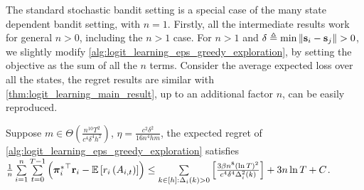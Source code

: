 The standard stochastic bandit setting is a special case of the many state dependent bandit setting, with $n = 1$. Firstly, all the intermediate results work for general $n > 0$, including the $n > 1$ case.
For $n > 1$ and $\delta \triangleq \min{\left\| {\mathbf{s}}_i - {\mathbf{s}}_j \right\|} > 0$, we slightly modify \cref{alg:logit_learning_eps_greedy_exploration}, by setting the objective as the sum of all the $n$ terms. Consider the average expected loss over all the states, the regret results are similar with \cref{thm:logit_learning_main_result}, up to an additional factor $n$, can be easily reproduced.
\begin{thm}
\label{thm:many_state_dependent_bandit_setting}
     Suppose $m \in \Theta\left( \frac{n^{10} T^2}{c^4 \delta^4 h^2} \right)$, $\eta = \frac{c^2 \delta^2}{16 n^4 h m}$, the expected regret of \cref{alg:logit_learning_eps_greedy_exploration} satisfies $\frac{1}{n } \sum\limits_{i=1}^{n}{ \sum\limits_{t=0}^{T-1}{ \left( {{\boldsymbol{\pi}}_i^*}^\top {\mathbf{r}}_i - {\mathbb{E}} \left[ r_i\left(A_{i,t}\right) \right] \right) } \le \sum\limits_{k \in [h] : \Delta_i(k) > 0}{ \left[ \frac{ 3 \beta n^8 \left( \ln{T} \right)^2}{c^4 \delta^4 \Delta_i^2(k)} \right] } + 3 n \ln{T} + C }$.
\end{thm}


